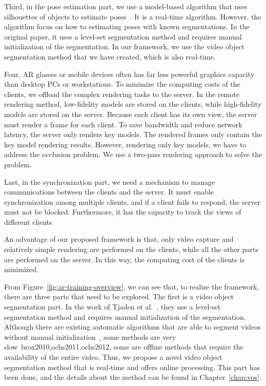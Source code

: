 Third, in the pose estimation part, we use a model-based algorithm that uses silhouettes of objects to estimate poses~\cite{tjaden2016}.
It is a real-time algorithm.
However, the algorithm focus on how to estimating poses with known segmentations. In the original paper, it uses a level-set segmentation method and requires manual initialization of the segmentation.
In our framework, we use the video object segmentation method that we have created, which is also real-time.

Four, AR glasses or mobile devices often has far less powerful graphics capacity than desktop PCs or workstations.
To minimize the computing costs of the clients, we offload the complex rendering tasks to the server.
In the remote rendering method, low-fidelity models are stored on the clients, while high-fidelity models are stored on the server.
Because each client has its own view, the server must render a frame for each client.
To save bandwidth and reduce network latency, the server only renders key models. The rendered frames only contain the key model rendering results.
However, rendering only key models, we have to address the occlusion problem. We use a two-pass rendering approach to solve the problem.

Last, in the synchronization part, we need a mechanism to manage communications between the clients and the server.
It must enable synchronization among multiple clients, and if a client fails to respond, the server must not be blocked.
Furthermore, it has the capacity to track the views of different clients

An advantage of our proposed framework is that, only video capture and relatively simple rendering are performed on the clients, while all the other parts are performed on the server.
In this way, the computing cost of the clients is minimized.

From Figure~\ref{fig:ar-training-overview}, we can see that, to realize the framework, there are three parts that need to be explored.
The first is a video object segmentation part. In the work of Tjaden et al.~\cite{tjaden2016}, they use a level-set segmentation method and requires manual initialization of the segmentation.
Although there are existing automatic algorithms that are able to segment videos without manual initialization~\cite{brox2010,ochs2011,ochs2012,papazoglou2013,wang2015}, some methods are very slow~{brox2010,ochs2011,ochs2012}, some are offline methods that require the availability of the entire video.
Thus, we propose a novel video object segmentation method that is real-time and offers online processing.
This part has been done, and the details about the method can be found in Chapter~\ref{chap:vos}.

